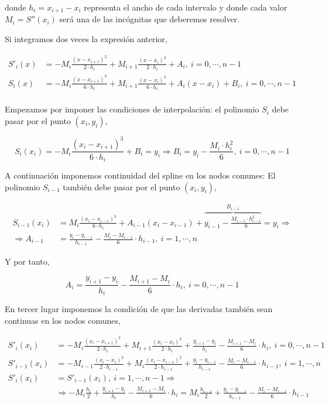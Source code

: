 \begin{paracol}{2}
donde $h_i=x_{i+1}-x_i$ representa el ancho de cada intervalo y donde cada valor $M_i=S''(x_i)$ será una de las incógnitas que deberemos resolver.

Si integramos dos veces la expresión anterior,
\end{paracol}
\begin{align*}
S'_i(x)&=-M_i\frac{(x-x_{i+1})^2}{2\cdot h_i}+M_{i+1}\frac{(x-x_i)^2}{2\cdot h_i}+A_i,\   i=0,\cdots, n-1\\
S_i(x)&=-M_i\frac{(x-x_{i+1})^3}{6\cdot h_i}+M_{i+1}\frac{(x-x_i)^3}{6\cdot h_i}+A_i(x-x_i)+B_i,\   i=0,\cdots, n-1\\
\end{align*}
\begin{paracol}{2}
Empezamos por imponer las condiciones de interpolación: el polinomio $S_i$ debe pasar por el punto $(x_i,y_i)$,
\end{paracol}
\begin{equation*}
S_i(x_i)=-M_i\frac{(x_i-x_{i+1})^3}{6\cdot h_i}+B_i=y_i \Rightarrow B_i=y_i-\frac{M_i\cdot h_i^2}{6},\ i=0,\cdots, n-1
\end{equation*}
\begin{paracol}{2}
A continuación imponemos continuidad del spline en los nodos comunes: El polinomio $S_{i-1}$ también debe pasar por el punto $(x_i, y_i)$,
\end{paracol}
\begin{align*}
S_{i-1}(x_i)&=M_i\frac{(x_i-x_{i-1})^3}{6\cdot h_i}+A_{i-1}(x_i-x_{i-1})+\overbrace{y_{i-1}-\frac{M_{i-1}\cdot h_{i-1}^2}{6}}^{B_{i-1}}=y_i \Rightarrow\\
\Rightarrow A_{i-1}&=\frac{y_i-y_{i-1}}{h_{i-1}}-\frac{M_i-M_{i-1}}{6}\cdot h_{i-1}, \ i=1,\cdots, n
\end{align*}
\begin{paracol}{2}
Y por tanto,
\end{paracol}
\begin{equation*}
A_i=\frac{y_{i+1}-y_i}{h_i}-\frac{M_{i+1}-M_i}{6}\cdot h_i, \ i=0,\cdots, n-1
\end{equation*}
\begin{paracol}{2}
En tercer lugar imponemos la condición de que las derivadas también sean continuas en los nodos comunes,
\end{paracol}
\begin{align*}
S'_i(x_i)&=-M_i\frac{(x_i-x_{i+1})^2}{2\cdot h_i}+M_{i+1}\frac{(x_i-x_i)^2}{2\cdot h_i}+\frac{y_{i+1}-y_i}{h_i}-\frac{M_{i+1}-M_i}{6}\cdot h_i,\   i=0,\cdots, n-1\\
S'_{i-1}(x_i)&=-M_{i-1}\frac{(x_i-x_i)^2}{2\cdot h_{i-1}}+M_{i}\frac{(x_i-x_{i-1})^2}{2\cdot h_{i-1 }}+\frac{y_i-y_{i-1}}{h_{i-1}}-\frac{M_i-M_{i-1}}{6}\cdot h_{i-1},\   i=1,\cdots, n\\
S'_i(x_i)&=S'_{i-1}(x_i) ,\   i=1,\cdots, n-1 \Rightarrow\\
&\Rightarrow -M_i\frac{h_i}{2}+\frac{y_{i+1}-y_i}{h_i}-\frac{M_{i+1}-M_i}{6}\cdot h_i=M_{i}\frac{h_{i-1}}{2}+\frac{y_i-y_{i-1}}{h_{i-1}}-\frac{M_i-M_{i-1}}{6}\cdot h_{i-1}
\end{align*}
